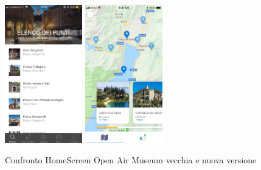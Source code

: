 \begin{figure}[h]
\centering
\includegraphics[width=0.3\textwidth]{images/screenSantarcangelo.jpg}
\includegraphics[width=0.3\textwidth]{images/listapunti.png}
\caption{Confronto HomeScreen Open Air Museum vecchia e nuova versione}
\end{figure}
\vspace{5mm}

